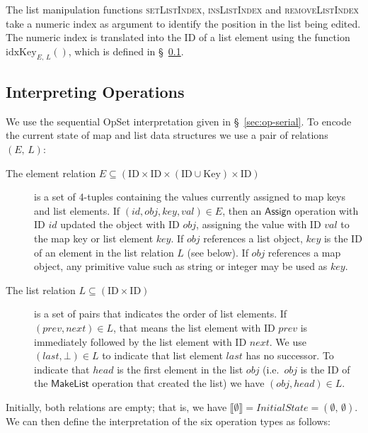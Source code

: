 The list manipulation functions \textsc{setListIndex}, \textsc{insListIndex} and \textsc{removeListIndex} take a numeric index as argument to identify the position in the list being edited.
The numeric index is translated into the ID of a list element using the function $\mathrm{idxKey}_{E,\, L}()$, which is defined in \S~\ref{sec:datatypes-interp}.

\subsection{Interpreting Operations}\label{sec:datatypes-interp}

We use the sequential OpSet interpretation given in \S~\ref{sec:op-serial}.
To encode the current state of map and list data structures we use a pair of relations $(E,\, L)$:
\begin{description}
    \item[The element relation $E \subseteq (\mathrm{ID} \times \mathrm{ID} \times (\mathrm{ID} \cup \mathrm{Key}) \times \mathrm{ID})$]
        is a set of 4-tuples containing the values currently assigned to map keys and list elements.
        If $(\mathit{id}, \mathit{obj}, \mathit{key}, \mathit{val}) \in E$, then an $\mathsf{Assign}$ operation with ID $\mathit{id}$ updated the object with ID $\mathit{obj}$, assigning the value with ID $\mathit{val}$ to the map key or list element $\mathit{key}$.
        If $\mathit{obj}$ references a list object, $\mathit{key}$ is the ID of an element in the list relation $L$ (see below).
        If $\mathit{obj}$ references a map object, any primitive value such as string or integer may be used as $\mathit{key}$.
    \item[The list relation $L \subseteq (\mathrm{ID} \times \mathrm{ID})$] is a set of pairs that indicates the order of list elements.
        If $(\mathit{prev}, \mathit{next}) \in L$, that means the list element with ID $\mathit{prev}$ is immediately followed by the list element with ID $\mathit{next}$.
        We use $(\mathit{last}, \bot) \in L$ to indicate that list element $\mathit{last}$ has no successor.
        To indicate that $\mathit{head}$ is the first element in the list $\mathit{obj}$ (i.e.\ $\mathit{obj}$ is the ID of the $\mathsf{MakeList}$ operation that created the list) we have $(\mathit{obj}, \mathit{head}) \in L$.
\end{description}
Initially, both relations are empty; that is, we have $\llbracket\emptyset\rrbracket = \mathit{InitialState} = (\emptyset,\, \emptyset)$.
We can then define the interpretation of the six operation types as follows:
